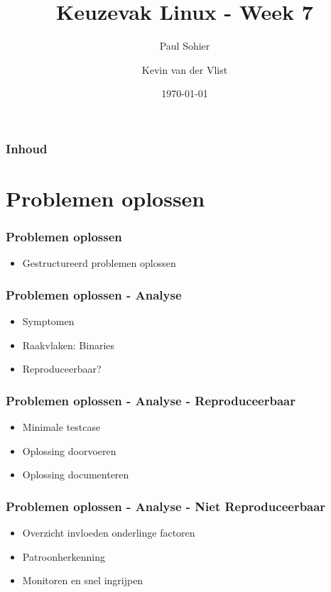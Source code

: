 \documentclass{beamer}
\title{Keuzevak Linux - Week 7}
\author{Paul Sohier \and Kevin van der Vlist}
\institute{Versie $1.0$}
\date{\today}
\begin{document}
\begin{frame}
  \titlepage
\end{frame} 

\begin{frame}
  \frametitle{Inhoud}
  \tableofcontents
\end{frame}

\section{Problemen oplossen}

\begin{frame}
  \frametitle{Problemen oplossen}
  \begin{itemize}
    \item<1-> Gestructureerd problemen oplossen
  \end{itemize}
\end{frame}

\begin{frame}
  \frametitle{Problemen oplossen - Analyse}
  \begin{itemize}
    \item<1-> Symptomen
    \item<2-> Raakvlaken: Binaries
    \item<3-> Reproduceerbaar?
  \end{itemize}
\end{frame}

\begin{frame}
  \frametitle{Problemen oplossen - Analyse - Reproduceerbaar}
  \begin{itemize}
    \item<1-> Minimale testcase
    \item<2-> Oplossing doorvoeren
    \item<3-> Oplossing documenteren
  \end{itemize}
\end{frame}

\begin{frame}
  \frametitle{Problemen oplossen - Analyse - Niet Reproduceerbaar}
  \begin{itemize}
    \item<1-> Overzicht invloeden onderlinge factoren
    \item<2-> Patroonherkenning
    \item<3-> Monitoren en snel ingrijpen
  \end{itemize}
\end{frame}
\end{document}
